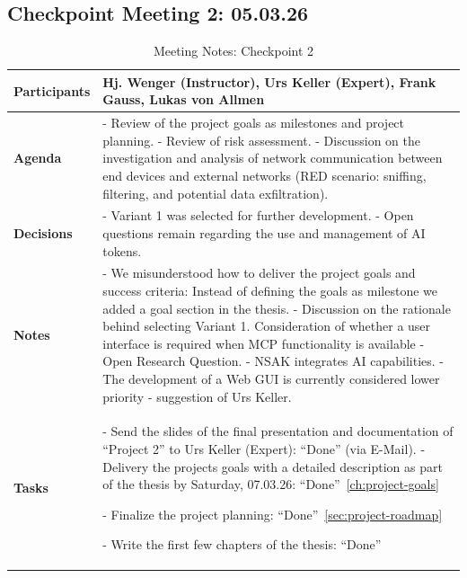 \subsection{Checkpoint Meeting 2: 05.03.26}\label{subsec:checkpoint-meeting-2}
\begin{table}[H]
	\centering
	\begin{tabular}{p{2.5cm} | p{10cm}}

		\textbf{Participants} &
		Hj. Wenger (Instructor), Urs Keller (Expert), Frank Gauss, Lukas von Allmen\\[6pt]
		\hline

		\textbf{Agenda} &
		- Review of the project goals as milestones and project planning. \newline
		- Review of risk assessment. \newline
		- Discussion on the investigation and analysis of network communication between end devices and external networks (RED scenario: sniffing, filtering, and potential data exfiltration). \\[6pt]
		\hline

		\textbf{Decisions} &
		- Variant 1 was selected for further development. \newline
		- Open questions remain regarding the use and management of \gls{AI} tokens. \\[10pt]
		\hline

		\textbf{Notes} &
		- We misunderstood how to deliver the project goals and success criteria: Instead of defining the goals as milestone we added a goal section in the thesis.\newline
		- Discussion on the rationale behind selecting Variant 1.\newline
		Consideration of whether a user interface is required when \gls{MCP} functionality is available - Open Research Question. \newline
		- \gls{NSAK} integrates \gls{AI} capabilities. \newline
		- The development of a Web GUI is currently considered lower priority - suggestion of Urs Keller.\\
		\hline

		\textbf{Tasks} &
		- Send the slides of the final presentation and documentation of \enquote{Project 2} to Urs Keller (Expert): \enquote{Done} (via E-Mail).
		- Delivery the projects goals with a detailed description as part of the thesis by Saturday, 07.03.26: \enquote{Done}~\ref{ch:project-goals}\par
		- Finalize the project planning: \enquote{Done}~\ref{sec:project-roadmap}\par
		- Write the first few chapters of the thesis: \enquote{Done}\\

	\end{tabular}
	\caption{Meeting Notes: Checkpoint 2}
	\label{tab:meeting-notes-checkpoint2}
\end{table}
